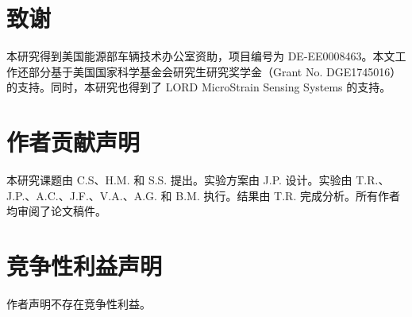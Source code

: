 \documentclass[fleqn,10pt]{wlscirep}
\begin{document}


\section*{致谢} 
本研究得到美国能源部车辆技术办公室资助，项目编号为 DE-EE0008463。本文工作还部分基于美国国家科学基金会研究生研究奖学金（Grant No. DGE1745016）的支持。同时，本研究也得到了 LORD MicroStrain Sensing Systems 的支持。

\section*{作者贡献声明}
本研究课题由 C.S、H.M. 和 S.S. 提出。实验方案由 J.P. 设计。实验由 T.R.、J.P.、A.C.、J.F.、V.A.、A.G. 和 B.M. 执行。结果由 T.R. 完成分析。所有作者均审阅了论文稿件。 

\section*{竞争性利益声明}
作者声明不存在竞争性利益。

\newpage
\appendix

\end{document}

